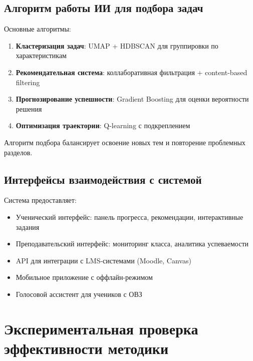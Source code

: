 \documentclass[a4paper,14pt]{extreport}
\begin{document}
\section{Алгоритм работы ИИ для подбора задач}
Основные алгоритмы:
\begin{enumerate}
    \item \textbf{Кластеризация задач}: UMAP + HDBSCAN для группировки по характеристикам
    \item \textbf{Рекомендательная система}: коллаборативная фильтрация + content-based filtering
    \item \textbf{Прогнозирование успешности}: Gradient Boosting для оценки вероятности решения
    \item \textbf{Оптимизация траектории}: Q-learning с подкреплением
\end{enumerate}
Алгоритм подбора балансирует освоение новых тем и повторение проблемных разделов.

\section{Интерфейсы взаимодействия с системой}
Система предоставляет:
\begin{itemize}
    \item Ученический интерфейс: панель прогресса, рекомендации, интерактивные задания
    \item Преподавательский интерфейс: мониторинг класса, аналитика успеваемости
    \item API для интеграции с LMS-системами (Moodle, Canvas)
    \item Мобильное приложение с оффлайн-режимом
    \item Голосовой ассистент для учеников с ОВЗ
\end{itemize}

\chapter{Экспериментальная проверка эффективности методики}
\end{document}
